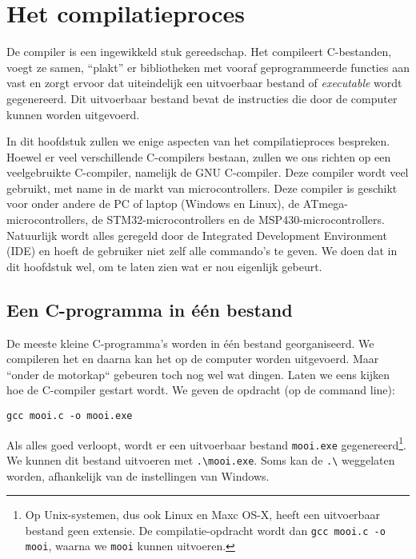 \chapter{Het compilatieproces}
\label{cha:compilatieproces}
\thispagestyle{empty}

De compiler is een ingewikkeld stuk gereedschap. Het compileert C-bestanden, voegt ze samen, ``plakt'' er bibliotheken met vooraf geprogrammeerde functies aan vast en zorgt ervoor dat uiteindelijk een uitvoerbaar bestand of \textsl{executable} wordt gegenereerd. Dit uitvoerbaar bestand bevat de instructies die door de computer kunnen worden uitgevoerd.

In dit hoofdstuk zullen we enige aspecten van het compilatieproces bespreken. Hoewel er veel verschillende C-compilers bestaan, zullen we ons richten op een veelgebruikte C-compiler, namelijk de GNU C-compiler. Deze compiler wordt veel gebruikt, met name in de markt van microcontrollers. Deze compiler is geschikt voor onder andere de PC of laptop (Windows en Linux), de ATmega-microcontrollers, de STM32-microcontrollers en de MSP430-microcontrollers. Natuurlijk wordt alles geregeld door de Integrated Development Environment (IDE) en hoeft de gebruiker niet zelf alle commando's te geven. We doen dat in dit hoofdstuk wel, om te laten zien wat er nou eigenlijk gebeurt.


\section{Een C-programma in één bestand}
De meeste kleine C-programma's worden in één bestand georganiseerd. We compileren het en daarna kan het op de computer worden uitgevoerd. Maar ``onder de motorkap`` gebeuren toch nog wel wat dingen. Laten we eens kijken hoe de C-compiler gestart wordt. We geven de opdracht (op de command line):

\hspace*{1em}\texttt{gcc mooi.c -o mooi.exe}

Als alles goed verloopt, wordt er een uitvoerbaar bestand \texttt{mooi.exe} gegenereerd\footnote{Op Unix-systemen, dus ook Linux en Maxc OS-X, heeft een uitvoerbaar bestand geen extensie. De compilatie-opdracht wordt dan \texttt{gcc mooi.c -o mooi}, waarna we \texttt{mooi} kunnen uitvoeren.}. We kunnen dit bestand uitvoeren met \texttt{.\textbackslash mooi.exe}. Soms kan de \texttt{.\textbackslash} weggelaten worden, afhankelijk van de instellingen van Windows.


